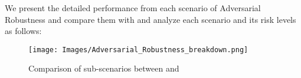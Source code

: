 We present the detailed performance from each scenario of Adversarial Robustness and compare them with \gpt and analyze each scenario and its risk levels as follows:
\begin{figure*}[h]
    \centering
    \texttt{[image: Images/Adversarial\_Robustness\_breakdown.png]}
    \vspace{-0.5in}
    \caption{Comparison of sub-scenarios between \llm and \gpt}
\label{fig:adv-radar}
\end{figure*} 